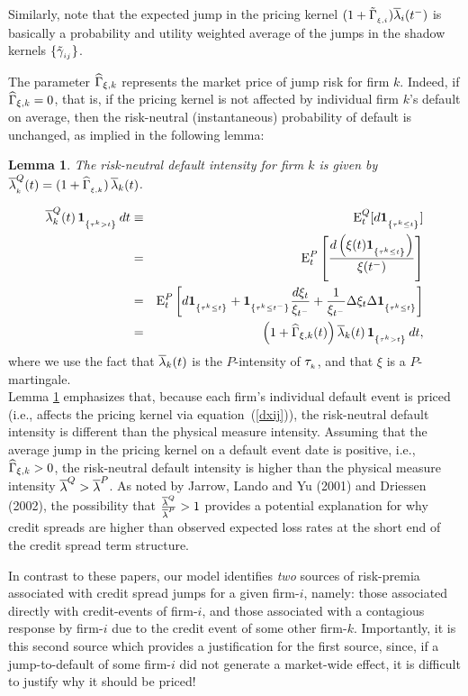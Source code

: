 \documentclass[titlepage,11pt]{article}
\def\by{\begin{eqnarray}}
\def\ey{\end{eqnarray}}
\newtheorem{lemma}{Lemma}
\begin{document}
Similarly, note that the expected jump in the pricing kernel
$(1+\tilde{\Gamma}_{_{{\xi,i}}})\overline{\lambda}_i(t^-)$ is basically a probability
and utility weighted average of the jumps in the shadow kernels
 $\{\tilde{\gamma}_{_{{ij}}}\}$.

The parameter ${\widehat \Gamma}_{\xi,k}$ represents the market price of jump risk
for firm $k$.  Indeed, if ${\widehat \Gamma}_{\xi,k}=0$, that is, if the pricing
kernel is not affected by individual firm $k$'s default on average,
then the risk-neutral (instantaneous) probability of default is
unchanged, as implied in the following lemma:
\begin{lemma}\label{Qint}
The risk-neutral default intensity for firm $k$ is given by
$\overline{\lambda}_{_{{k}}}^Q(t)=(1+{\widehat \Gamma}_{_{{\xi,k}}}) \, \overline{\lambda}_k(t)$.
\end{lemma}

 \by \lb_k^{Q}(t) \, \ind{\tau^k > t} \, dt
&\equiv&
\E^Q_t[d\ind{\tau^k\leq t}] \nonumber \\
%
&=&\E^P_t\left[\frac{d \left( \xi(t)\ind{\tau^k\leq t}
\right)}{\xi(t^{-})}\right]
\nonumber \\
%
&=& \E^P_t\left[ d\ind{\tau^k\leq t}+\ind{\tau^k\leq
t^-}\frac{d\xi_t}{\xi_{t^-}}
+\frac{1}{\xi_{t^-}}\Delta\xi_t\Delta\ind{\tau^k\leq t}\right] \nonumber \\
%
&=& \left( 1 + \HG_{\xi,k}(t) \right) \lb_k(t) \, \ind{\tau^k > t}
\, dt, \ey where we use the fact that $\overline{\lambda}_k(t)$ is the
$P$-intensity of $\tau_{_{{k}}}$, and that $\xi$ is
a $P$-martingale.\eproof\\

\noindent Lemma \ref{Qint} emphasizes that, because each firm's
individual default event is priced (i.e., affects the pricing kernel
via equation~(\ref{dxij})), the risk-neutral default intensity is
different than the physical measure intensity. Assuming that the
average jump in the pricing kernel on a default event date is
positive, i.e., ${\widehat \Gamma}_{\xi,k}>0$, the risk-neutral default intensity
is higher than the physical measure intensity $\overline{\lambda}^{Q}>\overline{\lambda}^P$.  As
noted by Jarrow, Lando and Yu (2001) and Driessen (2002), the
possibility that $\frac{\overline{\lambda}^Q}{\overline{\lambda}^P}>1$ provides a potential
explanation for why credit spreads are higher than observed expected
loss rates at the short end of the credit spread term structure.

In contrast to these papers, our model identifies {\em two} sources
of risk-premia associated with credit spread jumps for a given
firm-$i$, namely: those associated directly with credit-events of
firm-$i$, and those associated with a contagious response by
firm-$i$ due to the credit event of some other firm-$k$.
Importantly, it is this second source which provides a justification
for the first source, since, if a jump-to-default of some firm-$i$
did not generate a market-wide effect, it is difficult to justify
why it should be priced!
\end{document}
